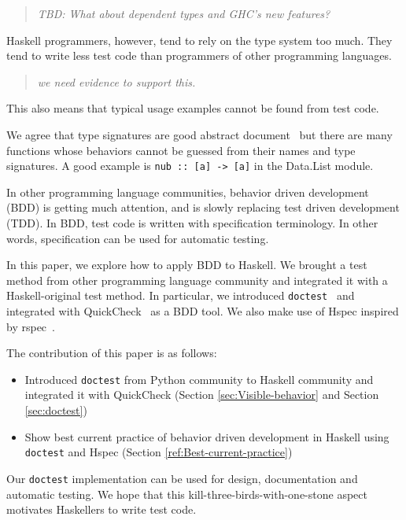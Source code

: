 \documentclass[preprint]{sigplanconf}
\newcommand{\hspec}{Hspec}
\begin{document}
\begin{quote}
    \emph{TBD: What about dependent types and GHC's new features?}
\end{quote}

Haskell programmers, however, tend to rely on the type system too much.  They
tend to write less test code than programmers of other programming languages.

\begin{quote}
    \emph{we need evidence to support this.}
\end{quote}

This also means that typical usage examples cannot be found from test code.

We agree that type signatures are good abstract document~\cite{free}
but there are many
functions whose behaviors cannot be guessed from their names and type
signatures. A good example is \verb|nub :: [a] -> [a]| in 
the Data.List module.

In other programming language communities,
behavior driven development (BDD) is getting much attention, and is
slowly replacing test driven development (TDD).
In BDD, test code is written with specification terminology.
In other words, specification can be used for automatic testing.

In this paper, we explore how to apply BDD to Haskell.
We brought a test method from other programming language community and
integrated it with a Haskell-original test method.
In particular, we introduced {\tt doctest}~\cite{doctest} and
integrated with QuickCheck~\cite{quickcheck} as a BDD tool.
We also make use of \hspec{} inspired by rspec~\cite{rspec}.

The contribution of this paper is as follows:

\begin{itemize}
\item Introduced {\tt doctest} from Python community to Haskell community
and integrated it with QuickCheck
(Section \ref{sec:Visible-behavior} and Section \ref{sec:doctest})
\item Show best current practice of behavior driven development in Haskell using {\tt doctest} and \hspec{} (Section \ref{ref:Best-current-practice})
\end{itemize}

\noindent Our {\tt doctest} implementation
can be used for design, documentation and automatic testing.
We hope that this kill-three-birds-with-one-stone aspect
motivates Haskellers to write test code.
\end{document}

